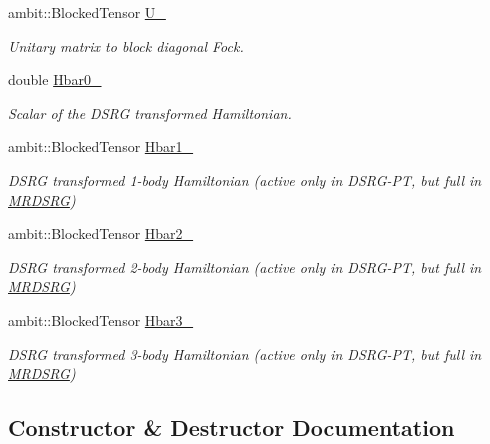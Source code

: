 \begin{DoxyCompactItemize}
ambit\+::\+Blocked\+Tensor \mbox{\hyperlink{classforte_1_1_s_a_d_s_r_g_a8d17815806feb01c5d1c0c1eba839c93}{U\+\_\+}}
\begin{DoxyCompactList}\small\item\em Unitary matrix to block diagonal Fock. \end{DoxyCompactList}\item 
double \mbox{\hyperlink{classforte_1_1_s_a_d_s_r_g_a70a8474f6cdb17a3c8df97fb91f3abbc}{Hbar0\+\_\+}}
\begin{DoxyCompactList}\small\item\em Scalar of the D\+S\+RG transformed Hamiltonian. \end{DoxyCompactList}\item 
ambit\+::\+Blocked\+Tensor \mbox{\hyperlink{classforte_1_1_s_a_d_s_r_g_a9a7f9261f2d277f6fd670e3cd22f3d62}{Hbar1\+\_\+}}
\begin{DoxyCompactList}\small\item\em D\+S\+RG transformed 1-\/body Hamiltonian (active only in D\+S\+R\+G-\/\+PT, but full in \mbox{\hyperlink{classforte_1_1_m_r_d_s_r_g}{M\+R\+D\+S\+RG}}) \end{DoxyCompactList}\item 
ambit\+::\+Blocked\+Tensor \mbox{\hyperlink{classforte_1_1_s_a_d_s_r_g_af8b73524ee116547df4573b957df878d}{Hbar2\+\_\+}}
\begin{DoxyCompactList}\small\item\em D\+S\+RG transformed 2-\/body Hamiltonian (active only in D\+S\+R\+G-\/\+PT, but full in \mbox{\hyperlink{classforte_1_1_m_r_d_s_r_g}{M\+R\+D\+S\+RG}}) \end{DoxyCompactList}\item 
ambit\+::\+Blocked\+Tensor \mbox{\hyperlink{classforte_1_1_s_a_d_s_r_g_a1e3197fcf7ab0004f844141fec529990}{Hbar3\+\_\+}}
\begin{DoxyCompactList}\small\item\em D\+S\+RG transformed 3-\/body Hamiltonian (active only in D\+S\+R\+G-\/\+PT, but full in \mbox{\hyperlink{classforte_1_1_m_r_d_s_r_g}{M\+R\+D\+S\+RG}}) \end{DoxyCompactList}\end{DoxyCompactItemize}


\subsection{Constructor \& Destructor Documentation}
\mbox{\label{classforte_1_1_s_a_d_s_r_g_a4adeef4774904ed48bd108b25bc98f60}} 
